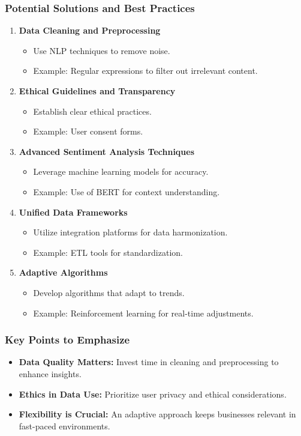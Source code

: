 \documentclass{beamer}
\begin{document}
\begin{frame}[fragile]
    \frametitle{Potential Solutions and Best Practices}
    \begin{enumerate}
        \item \textbf{Data Cleaning and Preprocessing}
            \begin{itemize}
                \item Use NLP techniques to remove noise.
                \item Example: Regular expressions to filter out irrelevant content.
            \end{itemize}
        \item \textbf{Ethical Guidelines and Transparency}
            \begin{itemize}
                \item Establish clear ethical practices.
                \item Example: User consent forms.
            \end{itemize}
        \item \textbf{Advanced Sentiment Analysis Techniques}
            \begin{itemize}
                \item Leverage machine learning models for accuracy.
                \item Example: Use of BERT for context understanding.
            \end{itemize}
        \item \textbf{Unified Data Frameworks}
            \begin{itemize}
                \item Utilize integration platforms for data harmonization.
                \item Example: ETL tools for standardization.
            \end{itemize}
        \item \textbf{Adaptive Algorithms}
            \begin{itemize}
                \item Develop algorithms that adapt to trends.
                \item Example: Reinforcement learning for real-time adjustments.
            \end{itemize}
    \end{enumerate}
\end{frame}

\begin{frame}[fragile]
    \frametitle{Key Points to Emphasize}
    \begin{itemize}
        \item \textbf{Data Quality Matters:} Invest time in cleaning and preprocessing to enhance insights.
        \item \textbf{Ethics in Data Use:} Prioritize user privacy and ethical considerations.
        \item \textbf{Flexibility is Crucial:} An adaptive approach keeps businesses relevant in fast-paced environments.
    \end{itemize}
\end{frame}
\end{document}
